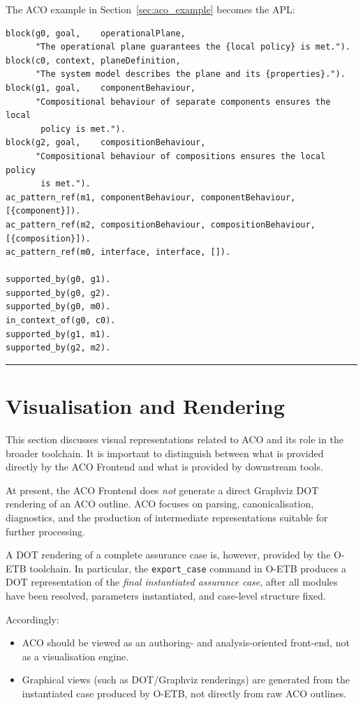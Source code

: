 \documentclass[11pt,twoside,a4paper]{article}
\begin{document}
The ACO example in Section~\ref{sec:aco_example} becomes the APL:

\begin{verbatim}
block(g0, goal,    operationalPlane,
      "The operational plane guarantees the {local policy} is met.").
block(c0, context, planeDefinition,
      "The system model describes the plane and its {properties}.").
block(g1, goal,    componentBehaviour,
      "Compositional behaviour of separate components ensures the local
       policy is met.").
block(g2, goal,    compositionBehaviour,
      "Compositional behaviour of compositions ensures the local policy
       is met.").
ac_pattern_ref(m1, componentBehaviour, componentBehaviour, [{component}]).
ac_pattern_ref(m2, compositionBehaviour, compositionBehaviour, [{composition}]).
ac_pattern_ref(m0, interface, interface, []).

supported_by(g0, g1).
supported_by(g0, g2).
supported_by(g0, m0).
in_context_of(g0, c0).
supported_by(g1, m1).
supported_by(g2, m2).
\end{verbatim}

\bigskip
\hrule
\bigskip

\section{Visualisation and Rendering}

This section discusses visual representations related to ACO and its role in the
broader toolchain. It is important to distinguish between what is provided directly
by the ACO Frontend and what is provided by downstream tools.

At present, the ACO Frontend does \emph{not} generate a direct Graphviz DOT rendering
of an ACO outline. ACO focuses on parsing, canonicalisation, diagnostics, and the
production of intermediate representations suitable for further processing.

A DOT rendering of a complete assurance case is, however, provided by the O-ETB
toolchain. In particular, the \texttt{export\_case} command in O-ETB produces a DOT
representation of the \emph{final instantiated assurance case}, after all modules
have been resolved, parameters instantiated, and case-level structure fixed.

Accordingly:
\begin{itemize}[leftmargin=2em]
  \item ACO should be viewed as an authoring- and analysis-oriented front-end,
        not as a visualisation engine.
  \item Graphical views (such as DOT/Graphviz renderings) are generated from the
        instantiated case produced by O-ETB, not directly from raw ACO outlines.
\end{itemize}
\end{document}
